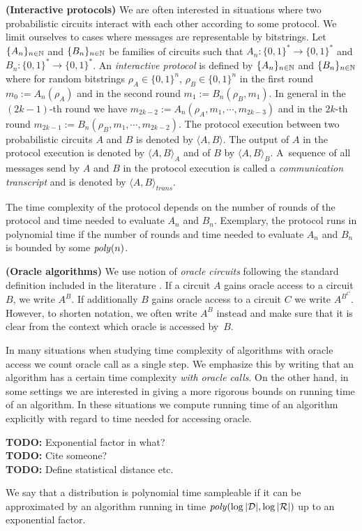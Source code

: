 \textbf{(Interactive protocols)}
We are often interested in situations where two probabilistic circuits interact with each other according to some protocol.
We limit ourselves to cases where messages are representable by bitstrings.
Let $\{A_n\}_{n \in \mathbb{N}}$ and $\{B_n\}_{n \in \mathbb{N}}$ be families of circuits such that $A_n : \{0,1\}^{*} \rightarrow \{0,1\}^{*}$ and $B_n : \{0,1\}^{*} \rightarrow \{0,1\}^{*}$.
An \textit{interactive protocol} is defined by $\{A_n\}_{n \in \mathbb{N}}$ and $\{B_n\}_{n \in \mathbb{N}}$ where
for random bitstrings $\rho_A \in \{0,1\}^{n}$, $\rho_B \in \{0,1\}^{n}$ in the first round $m_0 := A_n(\rho_A)$ and in the second round $m_1 := B_n(\rho_B, m_1)$.
In general in the $(2k\!-\!1)$-th round we have $m_{2k-2} := A_n(\rho_A, m_1, \cdots, m_{2k-3})$ and in the $2k$-th round $m_{2k-1} := B_n(\rho_B, m_1, \cdots, m_{2k-2})$.
The protocol execution between two probabilistic circuits $A$ and $B$ is denoted by $\langle A, B \rangle$.
The output of $A$ in the protocol execution is denoted by $\langle A, B \rangle_A$ and of $B$ by $\langle A, B \rangle_B$.
A~sequence of all messages send by $A$ and $B$ in the protocol execution is called a \textit{communication transcript} and
is denoted by $\langle A, B \rangle_{\mathit{trans}}$.

The time complexity of the protocol depends on the number of rounds of the protocol
and time needed to evaluate $A_n$ and $B_n$.
Exemplary, the protocol runs in polynomial time if the number of rounds and time needed to evaluate $A_n$ and $B_n$ is bounded by some $\operatorname{\mathit{poly}}(n)$.

\textbf{(Oracle algorithms)}
We use notion of \textit{oracle circuits} following the standard definition included in the literature \cite{Goldreich:2004:FCV:975541}.
If a circuit $A$ gains oracle access to a circuit $B$, we write $A^{B}$. If additionally $B$ gains oracle access to a circuit $C$
we write $A^{B^C}$. However, to shorten notation, we often write $A^{B}$ instead and make sure that it is clear from the context which oracle is accessed by~$B$.

In many situations when studying time complexity of algorithms with oracle access we count oracle call as a single step.
We emphasize this by writing that an algorithm has a certain time complexity \textit{with oracle calls}.
On the other hand, in some settings we are interested in giving a more rigorous bounds on running time of an algorithm.
In these situations we compute running time of an algorithm explicitly with regard to time needed for accessing oracle.
\begin{todo}
  \textbf{TODO:} Exponential factor in what?\\
  \textbf{TODO:} Cite someone? \\
  \textbf{TODO:} Define statistical distance etc.
\end{todo}
\begin{definition}
We say that a distribution is \textnormal{polynomial time sampleable} if it can be approximated by an algorithm running in time $\mathit{poly}(\log|\mathcal{D}|, \log|\mathcal{R}|)$
up to an exponential factor.
\end{definition}

